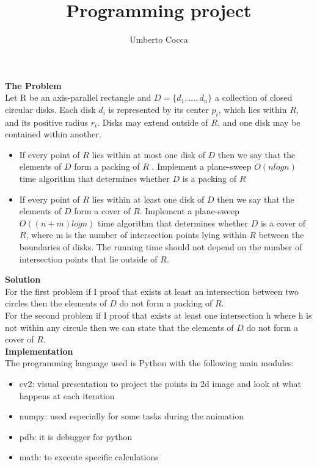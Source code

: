 \documentclass[12pt]{article}
\title{Programming project}
\author{Umberto Cocca}
\date{}
\begin{document}
\maketitle
\noindent \textbf{The Problem}\\
Let R be an axis-parallel rectangle and $D = \{d_1, ..., d_n\}$ a collection of closed circular disks.
Each disk $d_i$ is represented by its center $p_i$, which lies within $R$, and its positive radius $r_i$. Disks may extend outside of $R$, and one disk may be contained within another.

\begin{itemize}
	\item If every point of $R$ lies within at most one disk of $D$ then we say that the
	elements of $D$ form a packing of $R$ . Implement a plane-sweep $O(n log n)$ time algorithm
	that determines whether $D$ is a packing of $R$
	\item If every point of $R$ lies within at least one disk of $D$ then we say that the elements of $D$ form a cover of $R$. Implement a plane-sweep $O((n+m) log n)$ time algorithm that determines whether $D$ is a cover of $R$, where m is the number of intersection points lying within $R$ between the boundaries of disks. The running time should not depend on
	the number of intersection points that lie outside of $R$.
\end{itemize}


\noindent \textbf{Solution}\\
For the first problem if I proof that exists at least an intersection between two circles then the elements of $D$ do not form a packing of $R$. \\

\noindent For the second problem if I proof that exists at least one intersection h where h is not within any circule then we can state that the elements of $D$ do not form a cover of $R$. \\

\noindent \textbf{Implementation}\\
The programming language used is Python with the following main modules:
\begin{itemize}
	\item cv2: visual presentation to project the points in 2d image and look at what happens at each iteration
	\item numpy: used especially for some tasks during the animation
	\item pdb: it is debugger for python
	\item math: to execute specific calculations
\end{itemize}
\end{document}
